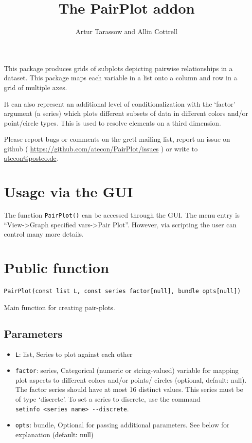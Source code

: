 \documentclass{article}
\title{The \textsf{PairPlot} addon}
\author{Artur Tarassow and Allin Cottrell}
\newcommand{\tightlist}{}
\begin{document}
\maketitle

This package produces grids of subplots depicting pairwise
relationships in a dataset.  This package maps each variable in a list
onto a column and row in a grid of multiple axes.

It can also represent an additional level of conditionalization with the
`factor' argument (a series) which plots different subsets of data in
different colors and/or point/circle types. This is used to resolve
elements on a third dimension.

Please report bugs or comments on the gretl mailing list, report an
issue on github ( \url{https://github.com/atecon/PairPlot/issues} ) or write
to \url{atecon@posteo.de}.

\section{Usage via the GUI}\label{usage-via-the-gui}

The function \texttt{PairPlot()} can be accessed through the GUI. The
menu entry is ``View-\textgreater Graph specified vars-\textgreater Pair
Plot''. However, via scripting the user can control many more details.

\section{Public function}\label{public-function}

\begin{verbatim}
PairPlot(const list L, const series factor[null], bundle opts[null])
\end{verbatim}

Main function for creating pair-plots.

\subsection{Parameters}\label{parameters}

\begin{itemize}
\tightlist
\item
  \texttt{L}: list, Series to plot against each other
\item
  \texttt{factor}: series, Categorical (numeric or string-valued)
  variable for mapping plot aspects to different colors and/or points/
  circles (optional, default: null). The factor series should have at
  most 16 distinct values. This series must be of type `discrete'. To
  set a series to discrete, use the command
  \texttt{setinfo\ \textless{}series\ name\textgreater{}\ -\/-discrete}.
\item
  \texttt{opts}: bundle, Optional for passing additional parameters. See
  below for explanation (default: null)
\end{itemize}
\end{document}
